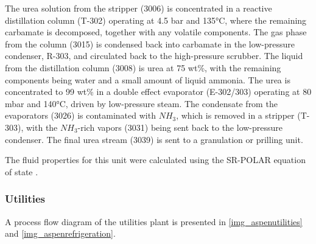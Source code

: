 \documentclass[a4paper, titlepage]{article}
\begin{document}
The urea solution from the stripper (3006) is concentrated in a reactive distillation column (T-302) operating at 
4.5 bar and 135°C, where the remaining carbamate is decomposed, together with any volatile components. The gas phase 
from the column (3015) is condensed back into carbamate in the low-pressure condenser, R-303, and circulated back to 
the high-pressure scrubber. The liquid from the distillation column (3008) is urea at 75 wt\%, with the remaining 
components being water and a small amount of liquid ammonia. The urea is concentrated to 99 wt\% in a double effect 
evaporator (E-302/303) operating at 80 mbar and 140°C, driven by low-pressure steam. The condensate from the 
evaporators (3026) is contaminated with $NH_3$, which is removed in a stripper (T-303), with the $NH_3$-rich vapors 
(3031) being sent back to the low-pressure condenser. The final urea stream (3039) is sent to a granulation or 
prilling unit.

The fluid properties for this unit were calculated using the SR-POLAR equation of state 
\cite{aspentechASPEN88Technical2011}.

\subsubsection{Utilities}

A process flow diagram of the utilities plant is presented in \autoref{img_aspenutilities} and
\autoref{img_aspenrefrigeration}.
\end{document}

